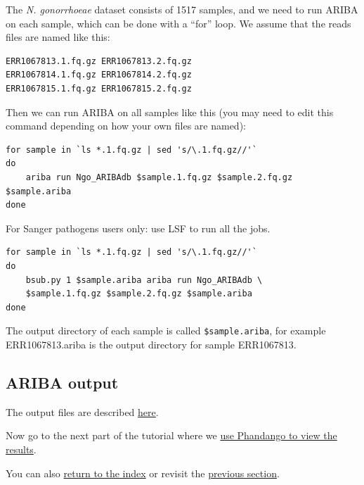\documentclass[11pt]{article}
\begin{document}
The \textit{N. gonorrhoeae} dataset consists of 1517 samples, and we need
to run ARIBA on each sample, which can be done with a ``for'' loop. We
assume that the reads files are named like this:

\begin{verbatim}
ERR1067813.1.fq.gz ERR1067813.2.fq.gz
ERR1067814.1.fq.gz ERR1067814.2.fq.gz
ERR1067815.1.fq.gz ERR1067815.2.fq.gz
\end{verbatim}

Then we can run ARIBA on all samples like this (you may need to edit
this command depending on how your own files are named):

\begin{verbatim}
for sample in `ls *.1.fq.gz | sed 's/\.1.fq.gz//'`
do
    ariba run Ngo_ARIBAdb $sample.1.fq.gz $sample.2.fq.gz $sample.ariba
done
\end{verbatim}


\newpage



For Sanger pathogens users only: use LSF to run all the jobs.

\begin{verbatim}
for sample in `ls *.1.fq.gz | sed 's/\.1.fq.gz//'`
do
    bsub.py 1 $sample.ariba ariba run Ngo_ARIBAdb \
    $sample.1.fq.gz $sample.2.fq.gz $sample.ariba
done
\end{verbatim}

The output directory of each sample is called \texttt{\$sample.ariba},
for example ERR1067813.ariba is the output directory for sample
ERR1067813.

    \hypertarget{ariba-output}{%
\subsection{ARIBA output}\label{ariba-output}}

The output files are described
\href{https://github.com/sanger-pathogens/ariba/wiki/Task:-run}{here}.

Now go to the next part of the tutorial where we
\href{phandango.ipynb}{use Phandango to view the results}.

You can also \href{index.ipynb}{return to the index} or revisit the
\href{make_custom_db.ipynb}{previous section}.





\newpage
\end{document}
